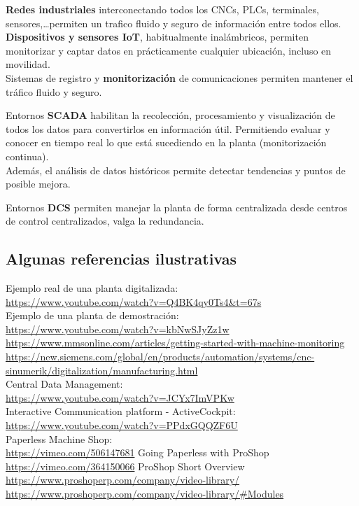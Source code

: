 \documentclass[spanish,12pt,a4paper,final,oneside]{book}
\begin{document}
\textbf{Redes industriales} interconectando todos los CNCs, PLCs, terminales, sensores,\ldots permiten un trafico fluido y seguro de información entre todos ellos.
\\\textbf{Dispositivos y sensores IoT}, habitualmente inalámbricos, permiten monitorizar y captar datos en prácticamente cualquier ubicación, incluso en movilidad.
\\ Sistemas de registro y \textbf{monitorización} de comunicaciones permiten mantener el tráfico fluido y seguro.

Entornos \textbf{SCADA} habilitan la recolección, procesamiento y visualización de todos los datos para convertirlos en información útil. Permitiendo evaluar y conocer en tiempo real lo que está sucediendo en la planta (monitorización continua).
\\Además, el análisis de datos históricos permite detectar tendencias y puntos de posible mejora.

Entornos \textbf{DCS} permiten manejar la planta de forma centralizada desde centros de control centralizados, valga la redundancia.

\subsection*{Algunas referencias ilustrativas}
Ejemplo real de una planta digitalizada:
\\ \url{https://www.youtube.com/watch?v=Q4BK4qy0Ts4&t=67s}
\\Ejemplo de una planta de demostración: 
\\ \url{https://www.youtube.com/watch?v=kbNwSJyZz1w}
\\ \url{https://www.mmsonline.com/articles/getting-started-with-machine-monitoring}
\\ \url{https://new.siemens.com/global/en/products/automation/systems/cnc-sinumerik/digitalization/manufacturing.html}
\\ Central Data Management: 
\\ \url{https://www.youtube.com/watch?v=JCYx7ImVPKw}
\\Interactive Communication platform - ActiveCockpit:
\\ \url{https://www.youtube.com/watch?v=PPdxGQQZF6U}
\\ Paperless Machine Shop:
\\ \url{https://vimeo.com/506147681} Going Paperless with ProShop
\\ \url{https://vimeo.com/364150066} ProShop Short Overview
\\ \url{https://www.proshoperp.com/company/video-library/}
\\ \url{https://www.proshoperp.com/company/video-library/#Modules}
\end{document}
